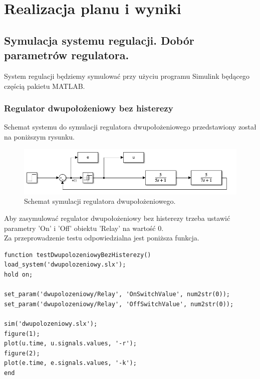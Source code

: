 \documentclass[a4paper,10pt]{article}
\begin{document}
\newpage
\section{Realizacja planu i wyniki}
\subsection{Symulacja systemu regulacji. Dobór parametrów regulatora.}\label{sec:zad1}

System regulacji będziemy symulować przy użyciu programu Simulink będącego częścią pakietu M\small ATLAB.\normalsize

\subsubsection{Regulator dwupołożeniowy bez histerezy}\label{sec:r2bh}

Schemat systemu do symulacji regulatora dwupołożeniowego przedstawiony został na poniższym rysunku.

\begin{figure}[!h]
    \centering
	\includegraphics[width=120mm]{dwu_schemat.png}
	\caption{Schemat symulacji regulatora dwupołożeniowego.}
    \label{fig:Rysunek}
\end{figure}

Aby zasymulować regulator dwupołożeniowy bez histerezy trzeba ustawić parametry 'On' i 'Off' obiektu 'Relay' na wartość 0. \\
Za przeprowadzenie testu odpowiedzialna jest poniższa funkcja.

\begin{lstlisting}[caption=Funkcja testująca regulator dwupołożeniowy bez histerezy.]
function testDwupolozeniowyBezHisterezy()
load_system('dwupolozeniowy.slx');
hold on;

set_param('dwupolozeniowy/Relay', 'OnSwitchValue', num2str(0));
set_param('dwupolozeniowy/Relay', 'OffSwitchValue', num2str(0));

sim('dwupolozeniowy.slx');
figure(1);
plot(u.time, u.signals.values, '-r');
figure(2);
plot(e.time, e.signals.values, '-k');
end
\end{lstlisting}
\end{document}
